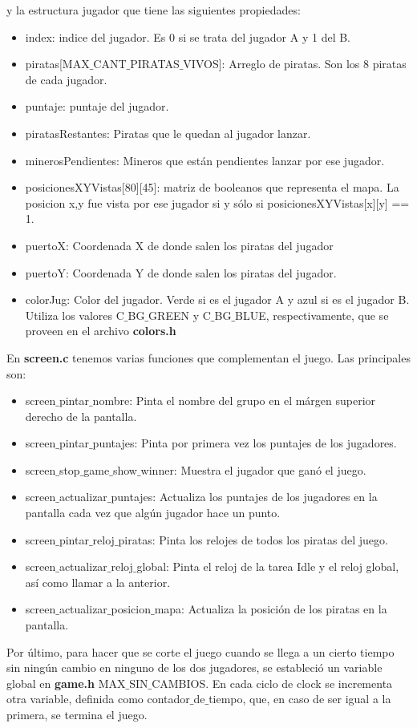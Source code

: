 y la estructura jugador que tiene las siguientes propiedades:
\begin{itemize}
\item index: indice del jugador. Es 0 si se trata del jugador A y 1 del B.
\item piratas[MAX$\_$CANT$\_$PIRATAS$\_$VIVOS]: Arreglo de piratas. Son los 8 piratas de cada jugador.
\item puntaje: puntaje del jugador.
\item piratasRestantes: Piratas que le quedan al jugador lanzar. 
\item minerosPendientes: Mineros que están pendientes lanzar por ese jugador. 
\item posicionesXYVistas[80][45]: matriz de booleanos que representa el mapa. La posicion x,y fue vista por ese jugador si y sólo si posicionesXYVistas[x][y] == 1.
\item puertoX: Coordenada X de donde salen los piratas del jugador
\item puertoY: Coordenada Y de donde salen los piratas del jugador. 
\item colorJug: Color del jugador. Verde si es el jugador A y azul si es el jugador B. Utiliza los valores C$\_$BG$\_$GREEN y C$\_$BG$\_$BLUE, respectivamente, que se proveen en el archivo \textbf{colors.h}
\end{itemize}
En \textbf{screen.c} tenemos varias funciones que complementan el juego. Las principales son:
\begin{itemize}
\item screen$\_$pintar$\_$nombre: Pinta el nombre del grupo en el márgen superior derecho de la pantalla.
\item screen$\_$pintar$\_$puntajes: Pinta por primera vez los puntajes de los jugadores.
\item screen$\_$stop$\_$game$\_$show$\_$winner: Muestra el jugador que ganó el juego.
\item screen$\_$actualizar$\_$puntajes: Actualiza los puntajes de los jugadores en la pantalla cada vez que algún jugador hace un punto.
\item screen$\_$pintar$\_$reloj$\_$piratas: Pinta los relojes de todos los piratas del juego. 
\item screen$\_$actualizar$\_$reloj$\_$global: Pinta el reloj de la tarea Idle y el reloj global, así como llamar a la anterior.
\item screen$\_$actualizar$\_$posicion$\_$mapa: Actualiza la posición de los piratas en la pantalla.
\end{itemize}
Por último, para hacer que se corte el juego cuando se llega a un cierto tiempo sin ningún cambio en ninguno de los dos jugadores, se estableció un variable global en \textbf{game.h} MAX$\_$SIN$\_$CAMBIOS. En cada ciclo de clock se incrementa otra variable, definida como contador$\_$de$\_$tiempo, que, en caso de ser igual a la primera, se termina el juego.
